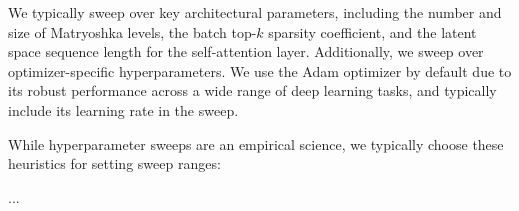  We typically sweep over key architectural parameters, including the number and size of Matryoshka levels, the batch top-$k$ sparsity coefficient, and the latent space sequence length for the self-attention layer. Additionally, we sweep over optimizer-specific hyperparameters. We use the Adam optimizer by default due to its robust performance across a wide range of deep learning tasks, and typically include its learning rate in the sweep.

 While hyperparameter sweeps are an empirical science, we typically choose these heuristics for setting sweep ranges:

 ...
